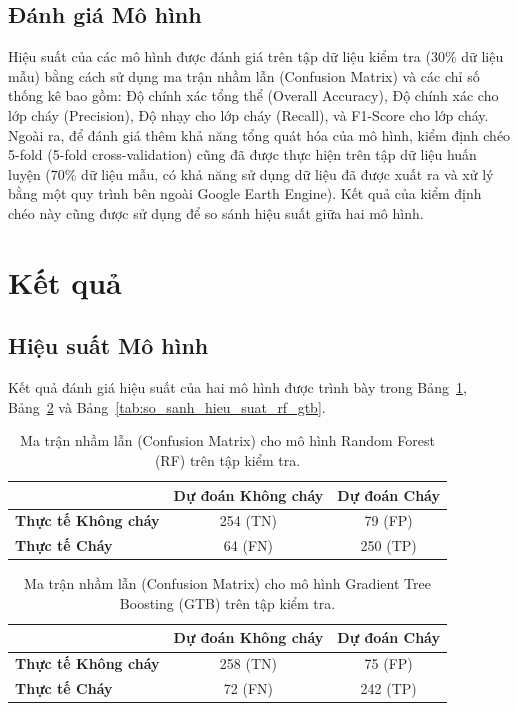 \documentclass{article}
\begin{document}
\subsection{Đánh giá Mô hình} %
Hiệu suất của các mô hình được đánh giá trên tập dữ liệu kiểm tra (30\% dữ liệu mẫu) bằng cách sử dụng ma trận nhầm lẫn (Confusion Matrix) và các chỉ số thống kê bao gồm: Độ chính xác tổng thể (Overall Accuracy), Độ chính xác cho lớp cháy (Precision), Độ nhạy cho lớp cháy (Recall), và F1-Score cho lớp cháy.
Ngoài ra, để đánh giá thêm khả năng tổng quát hóa của mô hình, kiểm định chéo 5-fold (5-fold cross-validation) cũng đã được thực hiện trên tập dữ liệu huấn luyện (70\% dữ liệu mẫu, có khả năng sử dụng dữ liệu đã được xuất ra và xử lý bằng một quy trình bên ngoài Google Earth Engine). Kết quả của kiểm định chéo này cũng được sử dụng để so sánh hiệu suất giữa hai mô hình.

\section{Kết quả} %

\subsection{Hiệu suất Mô hình} %
Kết quả đánh giá hiệu suất của hai mô hình được trình bày trong Bảng~\ref{tab:ma_tran_nham_lan_rf}, Bảng~\ref{tab:ma_tran_nham_lan_gtb} và Bảng~\ref{tab:so_sanh_hieu_suat_rf_gtb}.

\begin{table}[H]
\centering
\caption{Ma trận nhầm lẫn (Confusion Matrix) cho mô hình Random Forest (RF) trên tập kiểm tra.}
\label{tab:ma_tran_nham_lan_rf}
\begin{tabular}{>{\bfseries}lcc}
\toprule
& \textbf{Dự đoán Không cháy} & \textbf{Dự đoán Cháy} \\
\midrule
Thực tế Không cháy & 254 (TN) & 79 (FP) \\
Thực tế Cháy       & 64 (FN)  & 250 (TP) \\
\bottomrule
\end{tabular}
\end{table}

\begin{table}[H]
\centering
\caption{Ma trận nhầm lẫn (Confusion Matrix) cho mô hình Gradient Tree Boosting (GTB) trên tập kiểm tra.}
\label{tab:ma_tran_nham_lan_gtb}
\begin{tabular}{>{\bfseries}lcc}
\toprule
& \textbf{Dự đoán Không cháy} & \textbf{Dự đoán Cháy} \\
\midrule
Thực tế Không cháy & 258 (TN) & 75 (FP) \\
Thực tế Cháy       & 72 (FN)  & 242 (TP) \\
\bottomrule
\end{tabular}
\end{table}
\end{document}

